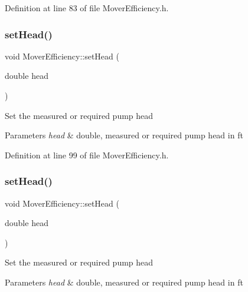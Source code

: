 Definition at line 83 of file Mover\+Efficiency.\+h.

\mbox{\label{class_mover_efficiency_a1dce269494ecdfc348c8d0a3f9d33df6}} 
\subsubsection{\texorpdfstring{set\+Head()}{setHead()}\hspace{0.1cm}{\footnotesize\ttfamily [1/3]}}
{\footnotesize\ttfamily void Mover\+Efficiency\+::set\+Head (\begin{DoxyParamCaption}\item[{double}]{head }\end{DoxyParamCaption})\hspace{0.3cm}{\ttfamily [inline]}}

Set the measured or required pump head 
\begin{DoxyParams}{Parameters}
{\em head} & double, measured or required pump head in ft \\
\hline
\end{DoxyParams}


Definition at line 99 of file Mover\+Efficiency.\+h.

\mbox{\label{class_mover_efficiency_a1dce269494ecdfc348c8d0a3f9d33df6}} 
\subsubsection{\texorpdfstring{set\+Head()}{setHead()}\hspace{0.1cm}{\footnotesize\ttfamily [2/3]}}
{\footnotesize\ttfamily void Mover\+Efficiency\+::set\+Head (\begin{DoxyParamCaption}\item[{double}]{head }\end{DoxyParamCaption})\hspace{0.3cm}{\ttfamily [inline]}}

Set the measured or required pump head 
\begin{DoxyParams}{Parameters}
{\em head} & double, measured or required pump head in ft \\
\hline
\end{DoxyParams}


